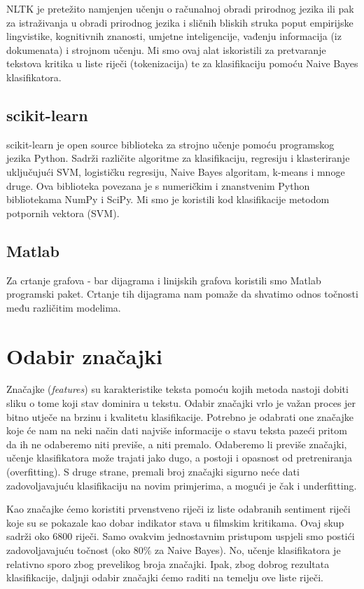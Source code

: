 \documentclass[conference]{IEEEtran}
\begin{document}
NLTK je pretežito namjenjen učenju o računalnoj obradi prirodnog jezika ili pak za istraživanja u obradi prirodnog jezika i sličnih bliskih struka poput empirijske lingvistike, kognitivnih znanosti, umjetne inteligencije, vađenju informacija (iz dokumenata) i strojnom učenju. Mi smo ovaj alat iskoristili za pretvaranje tekstova kritika u liste riječi (tokenizacija) te za klasifikaciju pomoću Naive Bayes klasifikatora.

\subsection{scikit-learn}

scikit-learn je open source biblioteka za strojno učenje pomoću programskog jezika Python. Sadrži različite algoritme za klasifikaciju, regresiju i klasteriranje uključujući SVM, logističku regresiju, Naive Bayes algoritam, k-means i mnoge druge. Ova biblioteka povezana je s numeričkim i znanstvenim Python bibliotekama NumPy i SciPy. Mi smo je koristili kod klasifikacije metodom potpornih vektora (SVM).

\subsection{Matlab}
Za crtanje grafova - bar dijagrama i linijskih grafova koristili smo Matlab programski paket. Crtanje tih dijagrama nam pomaže da shvatimo odnos točnosti među različitim modelima.

\section{Odabir značajki}

Značajke (\textit{features}) su karakteristike teksta pomoću kojih metoda nastoji dobiti sliku o tome koji stav dominira u tekstu. Odabir značajki vrlo je važan proces jer bitno utječe na brzinu i kvalitetu klasifikacije. Potrebno je odabrati one značajke koje će nam na neki način dati najviše informacije o stavu teksta pazeći pritom da ih ne odaberemo niti previše, a niti premalo. Odaberemo li previše značajki, učenje klasifikatora može trajati jako dugo, a postoji i opasnost od pretreniranja (overfitting). S druge strane, premali broj značajki sigurno neće dati zadovoljavajuću klasifikaciju na novim primjerima, a mogući je čak i underfitting.

Kao značajke ćemo koristiti prvenstveno riječi iz liste odabranih sentiment riječi \cite{words} koje su se pokazale kao dobar indikator stava u filmskim kritikama. Ovaj skup sadrži oko 6800 riječi. Samo ovakvim jednostavnim pristupom uspjeli smo postići zadovoljavajuću točnost (oko $80\%$ za Naive Bayes). No, učenje klasifikatora je relativno sporo zbog prevelikog broja značajki. Ipak, zbog dobrog rezultata klasifikacije, daljnji odabir značajki ćemo raditi na temelju ove liste riječi.
\end{document}
